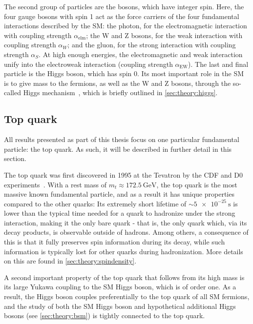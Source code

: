 The second group of particles are the bosons, which have integer spin. Here, the four gauge bosons with spin 1 act as the force carriers of the four fundamental interactions described by the SM: the photon, for the electromagnetic interaction with coupling strength $\alpha_{\mathrm{elm}}$; the W and Z bosons, for the weak interaction with coupling strength $\alpha_W$; and the gluon, for the strong interaction with coupling strength $\alpha_S$. At high enough energies, the electromagnetic and weak interaction unify into the electroweak interaction (coupling strength $\alpha_{\mathrm{EW}}$). The last and final particle is the Higgs boson, which has spin 0. Its most important role in the SM is to give mass to the fermions, as well as the W and Z bosons, through the so-called Higgs mechanism~\cite{Higgs:1964ia,Englert:1964et}, which is briefly outlined in \cref{sec:theory:higgs}.

\subsection{Top quark}

All results presented as part of this thesis focus on one particular fundamental particle: the top quark. As such, it will be described in further detail in this section.

The top quark was first discovered in 1995 at the Tevatron by the CDF and D0 experiments~\cite{CDF:1995wbb,D0:1995jca}. With a rest mass of $m_t \approx \SI{172.5}{\GeV}$, the top quark is the most massive known fundamental particle, and as a result it has unique properties compared to the other quarks: Its extremely short lifetime of $\sim \SI{5e-25}{\s}$ is lower than the typical time needed for a quark to hadronize under the strong interaction, making it the only bare quark - that is, the only quark which,  via its decay products, is observable outside of hadrons. Among others, a consequence of this is that it fully preserves spin information during its decay, while such information is typically lost for other quarks during hadronization. More details on this are found in \cref{sec:theory:spindensity}.

A second important property of the top quark that follows from its high mass is its large Yukawa coupling to the SM Higgs boson, which is of order one. As a result, the Higgs boson couples preferentially to the top quark of all SM fermions, and the study of both the SM Higgs boson and hypothetical additional Higgs bosons (see \cref{sec:theory:bsm}) is tightly connected to the top quark. 

